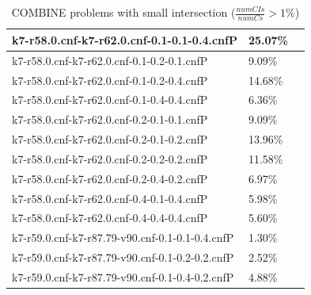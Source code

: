 \documentclass[12pt,a4paper,twoside]{scrartcl}
\numberwithin{equation}{section}
\begin{document}
\begin{table}[H]
\begin{center}
\begin{tabular}{|l|l|p{1cm}|}
k7-r58.0.cnf-k7-r62.0.cnf-0.1-0.1-0.4.cnfP&	25.07\%\\  \hline
k7-r58.0.cnf-k7-r62.0.cnf-0.1-0.2-0.1.cnfP&	9.09\%\\  \hline
k7-r58.0.cnf-k7-r62.0.cnf-0.1-0.2-0.4.cnfP&	14.68\%\\  \hline
k7-r58.0.cnf-k7-r62.0.cnf-0.1-0.4-0.4.cnfP&	6.36\%\\  \hline
k7-r58.0.cnf-k7-r62.0.cnf-0.2-0.1-0.1.cnfP&	9.09\%\\  \hline
k7-r58.0.cnf-k7-r62.0.cnf-0.2-0.1-0.2.cnfP&	13.96\%\\  \hline
k7-r58.0.cnf-k7-r62.0.cnf-0.2-0.2-0.2.cnfP&	11.58\%\\  \hline
k7-r58.0.cnf-k7-r62.0.cnf-0.2-0.4-0.2.cnfP&	6.97\%\\  \hline
k7-r58.0.cnf-k7-r62.0.cnf-0.4-0.1-0.4.cnfP&	5.98\%\\  \hline
k7-r58.0.cnf-k7-r62.0.cnf-0.4-0.4-0.4.cnfP&	5.60\%\\  \hline
k7-r59.0.cnf-k7-r87.79-v90.cnf-0.1-0.1-0.4.cnfP&	1.30\%\\  \hline
k7-r59.0.cnf-k7-r87.79-v90.cnf-0.1-0.2-0.2.cnfP&	2.52\%\\  \hline
k7-r59.0.cnf-k7-r87.79-v90.cnf-0.1-0.4-0.2.cnfP&	4.88\%\\  \hline
\end{tabular}
 \caption[Caption for LOF]{COMBINE problems with small intersection ($\frac{numCIs}{numCs} > 1\%$)\footnotemark}
\end{center}
\end{table} 
\end{document}

